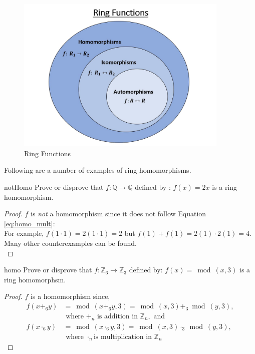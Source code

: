 \begin{figure}[H]
\begin{center}
\centerline {
\includegraphics[width=4in]{images/ringFunctions.jpg} }
\end{center}
\caption{Ring Functions}\label{fig:ring_functions}
\end{figure}

Following are a number of examples of ring homomorphisms.

\begin{example}{notHomo}
Prove or disprove that $f:{\mathbb Q}\rightarrow {\mathbb Q}$ defined by : $f(x)=2x$ is a ring homomorphism.

\begin{proof}
$f$ is \emph{not} a homomorphism since it does not follow Equation \ref{eq:homo_mult}:\\
For example, $f(1\cdot1)=2(1\cdot 1)=2$ but $f(1)+f(1)=2(1)\cdot 2(1)=4$.  Many other counterexamples can be found.\\
\end{proof}
\end{example}

\begin{example}{homo}
Prove or disprove that  $f:{\mathbb Z}_6\rightarrow {\mathbb Z}_3$ defined by: $f(x)=\bmod(x,3)$ is a ring homomorphsm.\\

\begin{proof}
$f$ is a homomorphism since,
\begin{align*}
f(x+_6y)&=\bmod(x+_6y,3)=\bmod(x,3)+_3\bmod(y,3),\\
&\text{ where } +_n \text{ is addition in } {\mathbb Z}_n, \text{ and}\\
f(x\cdot_6y)&=\bmod(x\cdot_6y,3)=\bmod(x,3)\cdot_3\bmod(y,3),\\ &\text{ where } \cdot_n \text{is multiplication in } {\mathbb Z}_n
\end{align*}
\end{proof}
\end{example}

